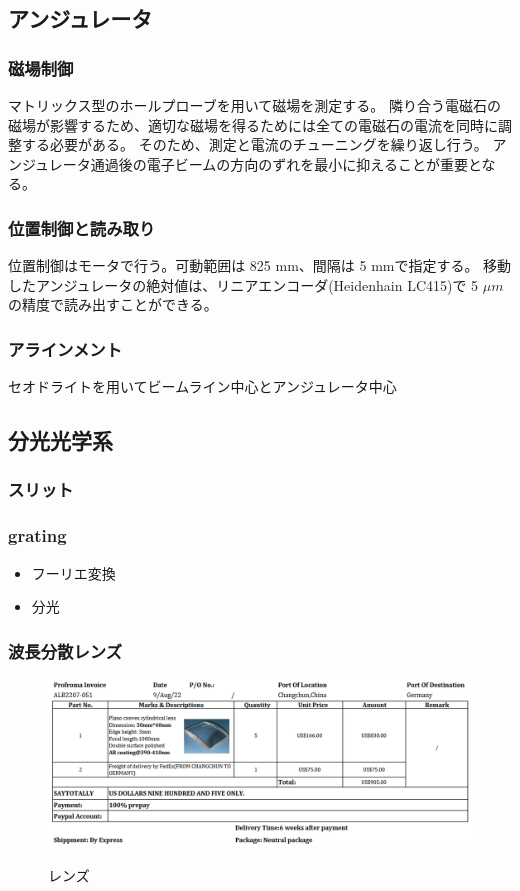 \documentclass[a4paper,11pt,uplatex]{jsbook}
\begin{document}
\subsection{アンジュレータ}
\subsubsection{磁場制御}
マトリックス型のホールプローブを用いて磁場を測定する。
隣り合う電磁石の磁場が影響するため、適切な磁場を得るためには全ての電磁石の電流を同時に調整する必要がある。
そのため、測定と電流のチューニングを繰り返し行う。
アンジュレータ通過後の電子ビームの方向のずれを最小に抑えることが重要となる。

\subsubsection{位置制御と読み取り}
位置制御はモータで行う。可動範囲は 825 mm、間隔は 5 mmで指定する。
移動したアンジュレータの絶対値は、リニアエンコーダ(Heidenhain LC415)で 5 $\mu m$ の精度で読み出すことができる。
\subsubsection{アラインメント}
セオドライトを用いてビームライン中心とアンジュレータ中心
\subsection{分光光学系}
\subsubsection{スリット}
\subsubsection{grating}
\begin{itemize}
  \item フーリエ変換
  \item 分光
\end{itemize}

\subsubsection{波長分散レンズ}
\begin{figure}[tb]
  \centering
  \includegraphics[width=0.8\linewidth]{image/3-lens.png}\\
  \caption{レンズ}
  \label{lens}
\end{figure}
\end{document}
